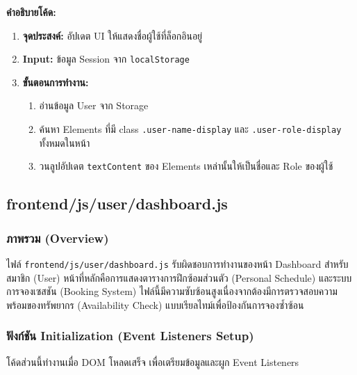 \textbf{คำอธิบายโค้ด:}
\begin{enumerate}
    \item \textbf{จุดประสงค์:} อัปเดต UI ให้แสดงชื่อผู้ใช้ที่ล็อกอินอยู่
    \item \textbf{Input:} ข้อมูล Session จาก \texttt{localStorage}
    \item \textbf{ขั้นตอนการทำงาน:}
    \begin{enumerate}
        \item อ่านข้อมูล User จาก Storage
        \item ค้นหา Elements ที่มี class \texttt{.user-name-display} และ \texttt{.user-role-display} ทั้งหมดในหน้า
        \item วนลูปอัปเดต \texttt{textContent} ของ Elements เหล่านั้นให้เป็นชื่อและ Role ของผู้ใช้
    \end{enumerate}
\end{enumerate}


\subsection{frontend/js/user/dashboard.js}

\subsubsection{ภาพรวม (Overview)}
\begin{sloppypar}
ไฟล์ \texttt{frontend/js/user/dashboard.js} รับผิดชอบการทำงานของหน้า Dashboard สำหรับสมาชิก (User) หน้าที่หลักคือการแสดงตารางการฝึกซ้อมส่วนตัว (Personal Schedule) และระบบการจองเซสชัน (Booking System) ไฟล์นี้มีความซับซ้อนสูงเนื่องจากต้องมีการตรวจสอบความพร้อมของทรัพยากร (Availability Check) แบบเรียลไทม์เพื่อป้องกันการจองซ้ำซ้อน
\end{sloppypar}

\subsubsection{ฟังก์ชัน Initialization (Event Listeners Setup)}
โค้ดส่วนนี้ทำงานเมื่อ DOM โหลดเสร็จ เพื่อเตรียมข้อมูลและผูก Event Listeners

